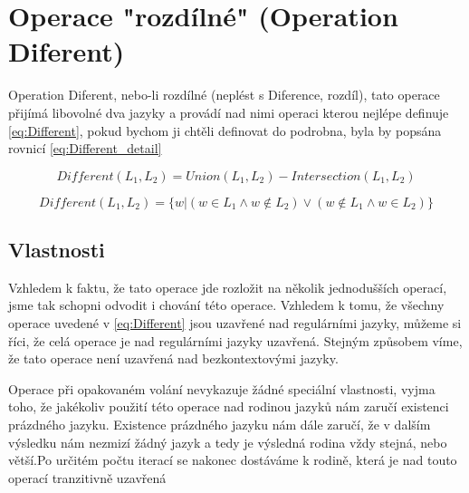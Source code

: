 \section{Operace "rozdílné" (Operation Diferent)}
\label{section:OD}
Operation Diferent, nebo-li rozdílné (neplést s Diference, rozdíl), tato operace přijímá libovolné dva jazyky a provádí nad nimi operaci kterou nejlépe definuje \ref{eq:Different}, pokud bychom ji chtěli definovat do podrobna, byla by popsána rovnicí \ref{eq:Different_detail}

\begin{equation}\label{eq:Different}
Different(L_{1}, L_{2}) = Union(L_{1}, L_{2}) - Intersection(L_{1}, L_{2})
\end{equation}


\begin{equation}\label{eq:Different_detail}
Different(L_{1}, L_{2}) = \{w| (w\in L_{1}\land  w\notin L_{2}) \lor (w\notin L_{1}\land  w\in L_{2})\}
\end{equation}

\subsection{Vlastnosti}
Vzhledem k faktu, že tato operace jde rozložit na několik jednodušších operací, jsme tak schopni odvodit i chování této operace. Vzhledem k tomu, že všechny operace uvedené v \ref{eq:Different} jsou uzavřené nad regulárními jazyky, můžeme si říci, že celá operace je nad regulárními jazyky uzavřená. Stejným způsobem víme, že tato operace není uzavřená nad bezkontextovými jazyky.

Operace při opakovaném volání nevykazuje žádné speciální vlastnosti, vyjma toho, že jakékoliv použití této operace nad rodinou jazyků nám zaručí existenci prázdného jazyku. Existence prázdného jazyku nám dále zaručí, že v dalším výsledku nám nezmizí žádný jazyk a tedy je výsledná rodina vždy stejná, nebo větší.Po určitém počtu iterací se nakonec dostáváme k rodině, která je nad touto operací tranzitivně uzavřená
